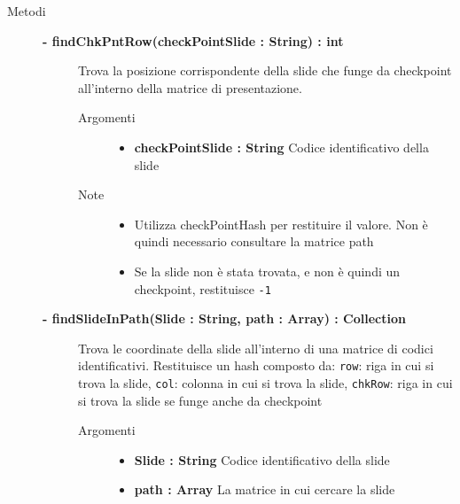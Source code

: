 \begin{description}
	
\item[Metodi] \hfill

	\begin{description}
		\item[\textbf{\color{blue}- findChkPntRow(checkPointSlide : String) : int			}] \hfill
			Trova la posizione corrispondente della slide che funge da checkpoint all'interno della matrice di presentazione.
			
		\begin{description}
			\item[Argomenti] \hfill
				\begin{itemize}
				
					\item \textbf{checkPointSlide : String		} \hfill
					Codice identificativo della slide
					
				\end{itemize}
			\item[Note] \hfill
			\begin{itemize}
					\item Utilizza checkPointHash per restituire il valore. Non è quindi necessario consultare la matrice path
					\item Se la slide non è stata trovata, e non è quindi un checkpoint, restituisce \texttt{-1}
			\end{itemize}
		\end{description}
	\end{description}
	
	\begin{description}
		\item[\textbf{\color{blue}- findSlideInPath(Slide : String, path : Array) : Collection			}] \hfill
			Trova le coordinate della slide all'interno di una matrice di codici identificativi. Restituisce un hash composto da: \texttt{row}: riga in cui si trova la slide, \texttt{col}: colonna in cui si trova la slide, \texttt{chkRow}: riga in cui si trova la slide se funge anche da checkpoint
			
		\begin{description}
			\item[Argomenti] \hfill
				\begin{itemize}
				
					\item \textbf{Slide : String		} \hfill
					Codice identificativo della slide
					\item \textbf{path : Array		} \hfill
					La matrice in cui cercare la slide
					

\end{itemize}
\end{description}
\end{description}
\end{description}

